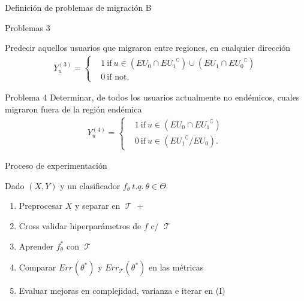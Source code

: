 \documentclass[xcolor=x11names]{beamer}
\DeclareMathOperator{\trainset}{\mathcal{T}}
\DeclareMathOperator{\testset}{\mathcal{T_s}}
\begin{document}

\begin{frame}{Definición de problemas de migración B}
	\begin{block}{Problemas 3}

		Predecir aquellos usuarios que migraron entre regiones, en cualquier dirección
		\begin{align*}
			Y^{(3)}_u =
			\begin{cases}
				&1 \ \mbox{if} \ u \in (EU_{0} \cap { EU_{1} }^{\complement}) \cup (EU_{1} \cap { EU_{0} }^{\complement}) \\
				&0 \ \mbox{if not}.
			\end{cases}
		\end{align*}
	\end{block}

	\begin{block}{Problema 4}
		Determinar, de todos los usuarios actualmente no endémicos, cuales migraron fuera de la región endémica
		\begin{align*}
			Y^{(4)}_u =
			\begin{cases}
				& 1 \ \mbox{if} \ u \in ( EU_{0} \cap { EU_{1} }^{\complement})    \\
				& 0 \ \mbox{if} \ u \in ( { EU_{1} }^{\complement} / EU_{0}).
			\end{cases}
		\end{align*}

	\end{block}

\end{frame}


\begin{frame}{ Proceso de experimentación }

Dado $(X,Y)$ y un clasificador $f_\theta \ t.q. \ \theta \in \Theta$
	\begin{enumerate}[I]
		\item Preprocesar $X$ y separar en $\trainset$ + $\testset$
		\item Cross validar hiperparámetros de $f$ c/ $\trainset$
		\item Aprender $f_\theta^*$ con $\trainset$
		\item Comparar  $Err_{\testset}(\theta^*)$ y  $Err_{\trainset}(\theta^*)$ en las métricas
		\item Evaluar mejoras en complejidad, varianza e iterar en (I)
	\end{enumerate}

\end{frame}
\end{document}

